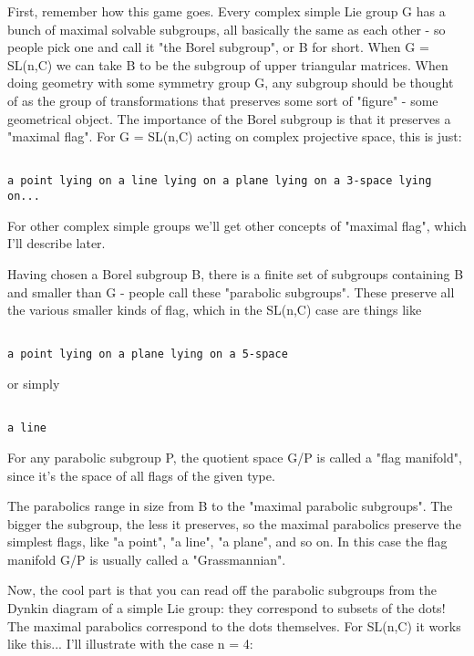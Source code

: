 First, remember how this game goes.  Every complex simple Lie group G has 
a bunch of maximal solvable subgroups, all basically the same as each
other - so people pick one and call it "the Borel subgroup", or B for
short.  When G = SL(n,C) we can take B to be the subgroup of upper
triangular matrices.  When doing geometry with some symmetry group G,
any subgroup should be thought of as the group of transformations that
preserves some sort of "figure" - some geometrical object.  The 
importance of the Borel subgroup is that it 
preserves a "maximal flag".  For G = SL(n,C)
acting on complex projective space, this is just:


\begin{verbatim}

a point lying on a line lying on a plane lying on a 3-space lying on...
\end{verbatim}
    
For other complex simple groups we'll get other concepts of "maximal flag",
which I'll describe later.

Having chosen a Borel subgroup B, there is a finite set of subgroups
containing B and smaller than G - people call these "parabolic
subgroups".  These preserve all the various smaller kinds of flag, 
which in the SL(n,C) case are things like 


\begin{verbatim}

a point lying on a plane lying on a 5-space
\end{verbatim}
    
or simply 


\begin{verbatim}

a line
\end{verbatim}
    
For any parabolic subgroup P, the quotient space G/P is called 
a "flag manifold", since it's the space of all  flags of the given type.

The parabolics range in size from B to the "maximal parabolic subgroups".
The bigger the subgroup, the less it preserves, so the maximal parabolics
preserve the simplest flags, like "a point", "a line", "a plane", and so
on.  In this case the flag manifold G/P is usually called a "Grassmannian".  

Now, the cool part is that you can read off the parabolic subgroups from
the Dynkin diagram of a simple Lie group: they correspond to subsets
of the dots!  The maximal parabolics correspond to the dots themselves.
For SL(n,C) it works like this... I'll illustrate with the case n = 4:


